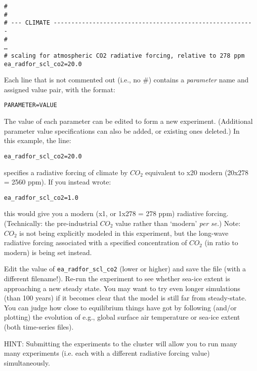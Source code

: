 \documentclass[11pt,fleqn]{book} %
\begin{document}
\vspace{-2mm}
\small\begin{verbatim}
#
#
# --- CLIMATE ---------------------------------------------------------
#
…
# scaling for atmospheric CO2 radiative forcing, relative to 278 ppm
ea_radfor_scl_co2=20.0
\end{verbatim}\normalsize
\vspace{-2mm}

Each line that is not commented out (i.e., no \#) contains a \textit{parameter} name and assigned value pair, with the format:
\vspace{-2mm}
\begin{verbatim}
PARAMETER=VALUE
\end{verbatim}
\vspace{-2mm}
The value of each parameter can be edited to form a new experiment. (Additional parameter value specifications can also be added, or existing ones deleted.) In this example, the line: 
\vspace{-2mm}
\begin{verbatim}
ea_radfor_scl_co2=20.0
\end{verbatim}
\vspace{-2mm}
specifies a radiative forcing of climate by \(CO_{2}\) equivalent to x20 modern (20x278 = 2560 ppm). If you instead wrote: 
\vspace{-2mm}
\begin{verbatim}
ea_radfor_scl_co2=1.0
\end{verbatim}
\vspace{-2mm}
this would give you a modern (x1, or 1x278 = 278 ppm) radiative forcing. (Technically: the pre-industrial \(CO_{2}\) value rather than ‘modern’ \textit{per se.})
Note: \(CO_{2}\) is not being explicitly modeled in this experiment, but the long-wave radiative forcing associated with a specified concentration of \(CO_{2}\) (in ratio to modern) is being set instead.

Edit the value of \texttt{ea\_radfor\_scl\_co2} (lower or higher) and save the file (with a different filename!). Re-run the experiment to see whether sea-ice extent is approaching a new steady state. You may want to try even longer simulations (than 100 years) if it becomes clear that the model is still far from steady-state. You can judge how close to equilibrium things have got by following (and/or plotting) the evolution of e.g., global surface air temperature or sea-ice extent (both time-series files).

HINT: Submitting the experiments to the cluster will allow you to run many many experiments (i.e. each with a different radiative forcing value) simultaneously.
\end{document}
